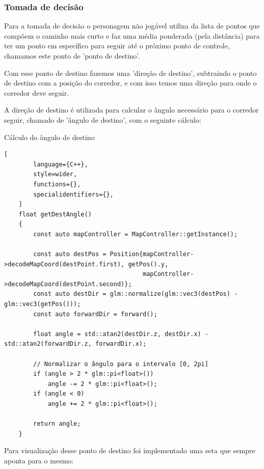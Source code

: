 \subsubsection{Tomada de decisão}

Para a tomada de decisão o personagem não jogável utiliza da lista de pontos que compõem o caminho mais curto e faz uma média ponderada (pela distância) para ter um ponto em específico para seguir até o próximo ponto de controle, chamamos este ponto de 'ponto de destino'.

Com esse ponto de destino fazemos uma 'direção de destino', subtraindo o ponto de destino com a posição do corredor, e com isso temos uma direção para onde o corredor deve seguir.

A direção de destino é utilizada para calcular o ângulo necessário para o corredor seguir, chamado de 'ângulo de destino', com o seguinte cálculo:

\begin{programruledcaption}{Cálculo do ângulo de destino}
    \begin{lstlisting}[
        language={C++},
        style=wider,
        functions={},
        specialidentifiers={},
    ]
    float getDestAngle()
	{
		const auto mapController = MapController::getInstance();

		const auto destPos = Position{mapController->decodeMapCoord(destPoint.first), getPos().y,
									  mapController->decodeMapCoord(destPoint.second)};
		const auto destDir = glm::normalize(glm::vec3(destPos) - glm::vec3(getPos()));
		const auto forwardDir = forward();

		float angle = std::atan2(destDir.z, destDir.x) - std::atan2(forwardDir.z, forwardDir.x);

		// Normalizar o ângulo para o intervalo [0, 2pi]
		if (angle > 2 * glm::pi<float>())
			angle -= 2 * glm::pi<float>();
		if (angle < 0)
			angle += 2 * glm::pi<float>();

		return angle;
	}
    \end{lstlisting}
\end{programruledcaption}

Para visualização desse ponto de destino foi implementado uma seta que sempre aponta para o mesmo:

